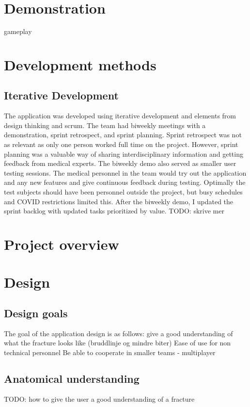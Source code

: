 \documentclass[a4paper]{report}
\begin{document}
\section{Demonstration}\label{demonstration}
gameplay

\section{Development methods}

\subsection{Iterative Development}
The application was developed using iterative development and elements from design thinking and scrum.
The team had biweekly meetings with a demonstration, sprint retrospect, and sprint planning. Sprint retrospect was not as relevant as only one person worked full time on the project. However, sprint planning was a valuable way of sharing interdisciplinary information and getting feedback from medical experts.
The biweekly demo also served as smaller user testing sessions. The medical personnel in the team would try out the application and any new features and give continuous feedback during testing. Optimally the test subjects should have been personnel outside the project, but busy schedules and COVID restrictions limited this.
After the biweekly demo, I updated the sprint backlog with updated tasks prioritized by value.
TODO: skrive mer

\section{Project overview}\label{CodeStructure}

\section{Design}

\subsection{Design goals}

The goal of the application design is as follows:
give a good understanding of what the fracture looks like (bruddlinje og mindre biter)
Ease of use for non technical personnel
Be able to cooperate in smaller teams - multiplayer

\subsection{Anatomical understanding}
TODO: how to give the user a good understanding of a fracture
\end{document}
